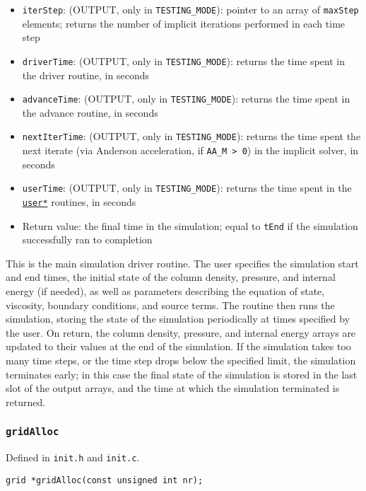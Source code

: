 \documentclass[12pt]{article}
\begin{document}
\begin{itemize}
\item \texttt{iterStep}: (OUTPUT, only in \verb=TESTING_MODE=): pointer to an array of \verb=maxStep= elements; returns the number of implicit iterations performed in each time step
\item \texttt{driverTime}: (OUTPUT, only in \verb=TESTING_MODE=): returns the time spent in the driver routine, in seconds
\item \texttt{advanceTime}: (OUTPUT, only in \verb=TESTING_MODE=): returns the time spent in the advance routine, in seconds
\item \texttt{nextIterTime}: (OUTPUT, only in \verb=TESTING_MODE=): returns the time spent the next iterate (via Anderson acceleration, if \verb=AA_M > 0=) in the implicit solver, in seconds
\item \texttt{userTime}: (OUTPUT, only in \verb=TESTING_MODE=): returns the time spent in the \hyperref[ssec:userFunc]{\texttt{user*}} routines, in seconds
\item Return value: the final time in the simulation; equal to \verb=tEnd= if the simulation successfully ran to completion
\end{itemize}

This is the main simulation driver routine. The user specifies the simulation start and end times, the initial state of the column density, pressure, and internal energy (if needed), as well as parameters describing the equation of state, viscosity, boundary conditions, and source terms. The routine then runs the simulation, storing the state of the simulation periodically at times specified by the user. On return, the column density, pressure, and internal energy arrays are updated to their values at the end of the simulation. If the simulation takes too many time steps, or the time step drops below the specified limit, the simulation terminates early; in this case the final state of the simulation is stored in the last slot of the output arrays, and the time at which the simulation terminated is returned.

\subsubsection{\texttt{gridAlloc}}
\label{sssec:gridAlloc}

Defined in \texttt{init.h} and \texttt{init.c}.

\begin{verbatim}
grid *gridAlloc(const unsigned int nr);
\end{verbatim}
\end{document}
